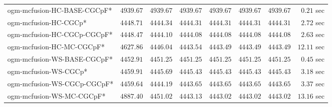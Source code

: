\begin{table}[H]
\begin{tabular}{lrrrrrrr}
\cmidrule{1-1} 
ogm-mcfusion-HC-BASE-CGCpF* & $      4939.67$ & $      4939.67$ & $      4939.67$ & $      4939.67$ & $      4939.67$ & $      4939.67$ & $         0.21$ sec   \\ 
ogm-mcfusion-HC-CGCp* & $      4448.71$ & $      4444.34$ & $      4444.31$ & $      4444.31$ & $      4444.31$ & $      4444.31$ & $         2.72$ sec   \\ 
ogm-mcfusion-HC-CGCp-CGCpF* & $      4448.47$ & $      4444.10$ & $      4444.08$ & $      4444.08$ & $      4444.08$ & $      4444.08$ & $         2.63$ sec   \\ 
ogm-mcfusion-HC-MC-CGCpF* & $      4627.86$ & $      4446.04$ & $      4443.54$ & $      4443.49$ & $      4443.49$ & $      4443.49$ & $        12.11$ sec   \\ 
ogm-mcfusion-WS-BASE-CGCpF* & $      4452.91$ & $      4451.25$ & $      4451.25$ & $      4451.25$ & $      4451.25$ & $      4451.25$ & $         0.45$ sec   \\ 
ogm-mcfusion-WS-CGCp* & $      4459.91$ & $      4445.69$ & $      4445.43$ & $      4445.43$ & $      4445.43$ & $      4445.43$ & $         3.18$ sec   \\ 
ogm-mcfusion-WS-CGCp-CGCpF* & $      4459.64$ & $      4444.19$ & $      4443.65$ & $      4443.65$ & $      4443.65$ & $      4443.65$ & $         3.37$ sec   \\ 
ogm-mcfusion-WS-MC-CGCpF* & $      4887.40$ & $      4451.02$ & $      4443.13$ & $      4443.02$ & $      4443.02$ & $      4443.02$ & $        13.16$ sec   \\ 
\bottomrule
\end{tabular}
\end{table}
